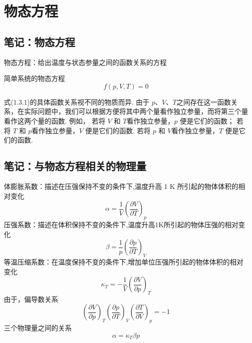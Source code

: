 \section{物态方程}



\subsection{笔记：物态方程}
物态方程：给出温度与状态参量之间的函数关系的方程


简单系统的物态方程
\begin{equation}
    f(p,V,T)=0
\end{equation}

式(1.3.1)的具体函数关系视不同的物质而异.
由于 $p$、$V$、$T$之间存在这一函数关系，在实际问题中，我们可以根据方便将其中两个量看作独立参量，而将第三个量看作这两个量的函数.
例如，
若将 $V$ 和 $T$看作独立参量，$p$ 便是它们的函数；
若将 $T$ 和 $p$看作独立参量，$V$ 便是它们的函数.
若将 $p$ 和 $V$看作独立参量，$T$ 便是它们的函数.

\subsection{笔记：与物态方程相关的物理量}
体膨胀系数：描述在压强保持不变的条件下,温度升高 1 K 所引起的物体体积的相对变化
\begin{equation}
    \alpha = \frac{1}{V}\left( \frac{\partial V}{\partial T}\right)_{p} 
\end{equation}
压强系数：描述在体积保持不变的条件下,温度升高1K所引起的物体压强的相对变化
\begin{equation}
     \beta = \frac{1}{p}\left( \frac{\partial p}{\partial T}\right)_{V} 
\end{equation}
等温压缩系数：在温度保持不变的条件下,增加单位压强所引起的物体体积的相对变化
\begin{equation}
     \kappa_{T} = - \frac{1}{V}\left( \frac{\partial V}{\partial p}\right)_{T}
\end{equation}
由于，偏导数关系
\begin{equation}
     \left(\frac{\partial V}{\partial p}\right)_T\left(\frac{\partial p}{\partial T}\right)_V\left(\frac{\partial T}{\partial V}\right)_p=-1
\end{equation}
三个物理量之间的关系
\begin{equation}
    \alpha=\kappa_T\beta p
\end{equation}

\newpage
